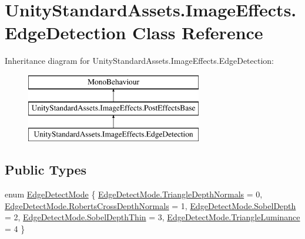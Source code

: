 \hypertarget{class_unity_standard_assets_1_1_image_effects_1_1_edge_detection}{}\section{Unity\+Standard\+Assets.\+Image\+Effects.\+Edge\+Detection Class Reference}
\label{class_unity_standard_assets_1_1_image_effects_1_1_edge_detection}
Inheritance diagram for Unity\+Standard\+Assets.\+Image\+Effects.\+Edge\+Detection\+:\begin{figure}[H]
\begin{center}
\leavevmode
\includegraphics[height=3.000000cm]{class_unity_standard_assets_1_1_image_effects_1_1_edge_detection}
\end{center}
\end{figure}
\subsection*{Public Types}
\begin{DoxyCompactItemize}
\item 
enum \mbox{\hyperlink{class_unity_standard_assets_1_1_image_effects_1_1_edge_detection_a6da59c4041099c1f590eb1e4fc64d0b1}{Edge\+Detect\+Mode}} \{ \newline
\mbox{\hyperlink{class_unity_standard_assets_1_1_image_effects_1_1_edge_detection_a6da59c4041099c1f590eb1e4fc64d0b1a7d24919ed28094f0202232ee6d708fa4}{Edge\+Detect\+Mode.\+Triangle\+Depth\+Normals}} = 0, 
\mbox{\hyperlink{class_unity_standard_assets_1_1_image_effects_1_1_edge_detection_a6da59c4041099c1f590eb1e4fc64d0b1ac2b6fd3b6c9c392cd93579f3be952a8f}{Edge\+Detect\+Mode.\+Roberts\+Cross\+Depth\+Normals}} = 1, 
\mbox{\hyperlink{class_unity_standard_assets_1_1_image_effects_1_1_edge_detection_a6da59c4041099c1f590eb1e4fc64d0b1acd3bd205137fb800eb3bb6533468dfe7}{Edge\+Detect\+Mode.\+Sobel\+Depth}} = 2, 
\mbox{\hyperlink{class_unity_standard_assets_1_1_image_effects_1_1_edge_detection_a6da59c4041099c1f590eb1e4fc64d0b1a98e5dbe639f7850feb04dce03f5744ee}{Edge\+Detect\+Mode.\+Sobel\+Depth\+Thin}} = 3, 
\newline
\mbox{\hyperlink{class_unity_standard_assets_1_1_image_effects_1_1_edge_detection_a6da59c4041099c1f590eb1e4fc64d0b1a1707b04c2953253bad60f979add23dea}{Edge\+Detect\+Mode.\+Triangle\+Luminance}} = 4
 \}
\end{DoxyCompactItemize}

